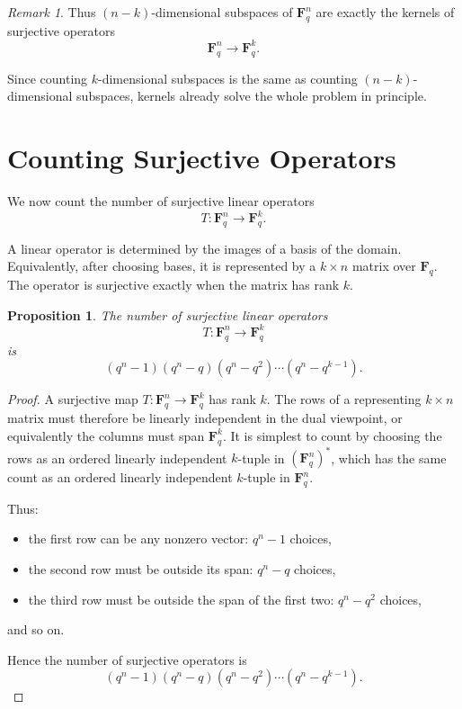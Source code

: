 \documentclass[11pt]{article}
\newtheorem{proposition}[theorem]{Proposition}
\theoremstyle{definition}
\theoremstyle{remark}
\newtheorem{remark}[theorem]{Remark}
\newcommand{\F}{\mathbf{F}}
\begin{document}
	\begin{remark}
		Thus \((n-k)\)-dimensional subspaces of \(\F_q^n\) are exactly the kernels of surjective operators
		\[
		\F_q^n\to \F_q^k.
		\]
	\end{remark}
	
	Since counting \(k\)-dimensional subspaces is the same as counting \((n-k)\)-dimensional subspaces, kernels already solve the whole problem in principle.
	
	\section{Counting Surjective Operators}
	
	We now count the number of surjective linear operators
	\[
	T:\F_q^n\to \F_q^k.
	\]
	
	A linear operator is determined by the images of a basis of the domain. Equivalently, after choosing bases, it is represented by a \(k\times n\) matrix over \(\F_q\). The operator is surjective exactly when the matrix has rank \(k\).
	
	\begin{proposition}
		The number of surjective linear operators
		\[
		T:\F_q^n\to \F_q^k
		\]
		is
		\[
		(q^n-1)(q^n-q)(q^n-q^2)\cdots(q^n-q^{k-1}).
		\]
	\end{proposition}
	
	\begin{proof}
		A surjective map \(T:\F_q^n\to \F_q^k\) has rank \(k\). The rows of a representing \(k\times n\) matrix must therefore be linearly independent in the dual viewpoint, or equivalently the columns must span \(\F_q^k\). It is simplest to count by choosing the rows as an ordered linearly independent \(k\)-tuple in \((\F_q^n)^*\), which has the same count as an ordered linearly independent \(k\)-tuple in \(\F_q^n\).
		
		Thus:
		\begin{itemize}
			\item the first row can be any nonzero vector: \(q^n-1\) choices,
			\item the second row must be outside its span: \(q^n-q\) choices,
			\item the third row must be outside the span of the first two: \(q^n-q^2\) choices,
		\end{itemize}
		and so on.
		
		Hence the number of surjective operators is
		\[
		(q^n-1)(q^n-q)(q^n-q^2)\cdots(q^n-q^{k-1}).
		\]
	\end{proof}
	
\end{document}
